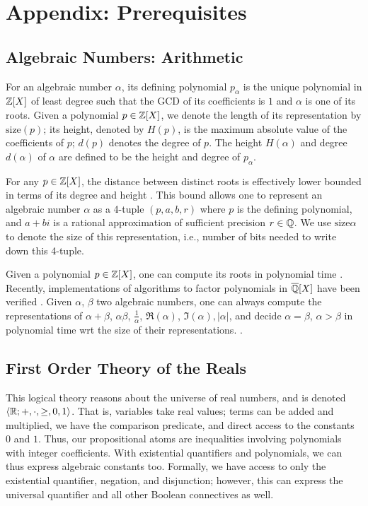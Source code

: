 \section{Appendix: Prerequisites}
\label{appendix:prelims}

\subsection{Algebraic Numbers: Arithmetic}
For an algebraic number $\alpha$, its defining polynomial $p_\alpha$ is the unique polynomial in $\mathbb{Z}[X]$ of least degree such that the GCD of its coefficients is $1$ and $\alpha$ is one of its roots.
Given a polynomial $p \in \mathbb{Z}[X]$, we denote the length of its representation by $\text{size}(p)$; its height, denoted by $H(p)$, is the maximum absolute value of the coefficients of $p$; $d(p)$ denotes the degree of $p$. The height $H(\alpha)$ and degree $d(\alpha)$ of $\alpha$ are defined to be the height and degree of $p_\alpha$.

For any $p \in \mathbb{Z}[X]$, the distance between distinct roots is effectively lower bounded in terms of its degree and height \cite{mignottecon}.
This bound allows one to represent an algebraic number $\alpha$ as a 4-tuple $(p,a,b,r)$ where $p$ is the defining polynomial, and $a+bi$ is a rational approximation of sufficient precision $r\in\mathbb{Q}$. We use $\text{size}{\alpha}$ to denote the size of this representation, i.e., number of bits needed to write down this 4-tuple.

Given a polynomial $p\in \mathbb{Z}[X]$, one can compute its roots in polynomial time \cite{findroots1operate1}. Recently, implementations of algorithms to factor polynomials in $\overline{\mathbb{Q}}[X]$ have been verified \cite{factor-algebraic}. Given $\alpha$, $\beta$ two algebraic numbers, one can always compute the representations of $\alpha+\beta$, $\alpha\beta$, $\frac 1 \alpha$, $\Re(\alpha)$, $\Im(\alpha), |\alpha|$, and decide $\alpha = \beta$, $\alpha > \beta$ in polynomial time wrt the size of their representations. \cite{findroots1operate1,findroots2operate2}.

\subsection{First Order Theory of the Reals}
This logical theory reasons about the universe of real numbers, and is denoted $\langle\mathbb{R}; +, \cdot, \ge, 0, 1\rangle$. That is, variables take real values; terms can be added and multiplied, we have the comparison predicate, and direct access to the constants $0$ and $1$. Thus, our propositional atoms are inequalities involving polynomials with integer coefficients. With existential quantifiers and polynomials, we can thus express algebraic constants too. Formally, we have access to only the existential quantifier, negation, and disjunction; however, this can express the universal quantifier and all other Boolean connectives as well.

